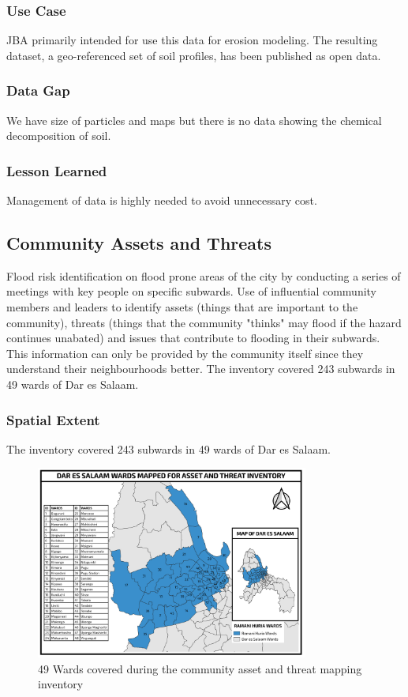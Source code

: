 \documentclass[a4paper,12pt,twoside]{article}
\begin{document}
\subsubsection{Use Case}
JBA  primarily intended for use this data for erosion modeling. The resulting dataset, a geo-referenced set of soil profiles, has been published as open data.

\subsubsection{Data Gap}
We have size of particles and maps but there is no data showing the chemical decomposition of soil.

\subsubsection{Lesson Learned}
Management of data is highly needed to avoid unnecessary cost.

\newpage

\subsection{Community Assets and Threats}

\begin{multicols}{2}
Flood risk identification on flood prone areas of the city by conducting a series of meetings with key people on specific subwards. Use of influential community members and leaders to identify assets (things that are important to the community), threats (things that the community "thinks" may flood if the hazard continues unabated) and issues that contribute to flooding in their subwards. This information can only be provided by the community itself since they understand their neighbourhoods better. The inventory covered  243 subwards in 49 wards of Dar es Salaam. 
\end{multicols}

\subsubsection{Spatial Extent}
The inventory covered  243 subwards in 49 wards of Dar es Salaam. 

\begin{figure}[h]
  \color{RHgreen}\caption{49 Wards covered during the community asset and threat mapping inventory}
  \centering
  \includegraphics[width=0.8\textwidth]{images/asset_and_threat_wards.png}
\end{figure}
\end{document}
